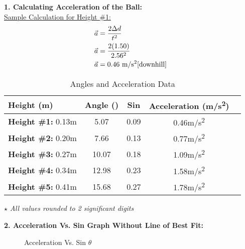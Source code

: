 \documentclass[12pt,letterpaper]{article}
\begin{document}
\textbf{1. Calculating Acceleration of the Ball:} \\
\underline{Sample Calculation for Height \#1:}\\
\[
	\begin{aligned}
		\vec{a} & =\frac{2\Delta d}{t^2}                        \\
		\vec{a} & =\frac{2(1.50)}{2.56^2}                       \\
		\vec{a} & =0.46~\text{m/s\textsuperscript{2}[downhill]}
	\end{aligned}
\]
\begin{table}[H]
	\caption{Angles and Acceleration Data\label{table2}}
	\begin{tabular*}{\textwidth}{l@{\extracolsep{\fill}}cccc}
		\hline
		\textbf{\hspace{4mm} Height (m)} & \textbf{Angle (\textdegree)} & \textbf{Sin \bm{$\theta$}} & \textbf{Acceleration (m/s\textsuperscript{2})} \\
		\hline
		\textbf{Height \#1:} 0.13m& 5.07\textdegree& 0.09& 0.46m/s\textsuperscript{2}\\
		\textbf{Height \#2:} 0.20m& 7.66\textdegree& 0.13& 0.77m/s\textsuperscript{2}\\
		\textbf{Height \#3:} 0.27m& 10.07\textdegree& 0.18& 1.09m/s\textsuperscript{2}\\
		\textbf{Height \#4:} 0.34m& 12.98\textdegree& 0.23& 1.58m/s\textsuperscript{2}\\
		\textbf{Height \#5:} 0.41m& 15.68\textdegree& 0.27& 1.78m/s\textsuperscript{2}\\
		\hline
	\end{tabular*}
\end{table}
\vspace{-8mm}
\textit{$\star$ All values rounded to 2 significant digits}
\newpage

\noindent
\textbf{2. Acceleration Vs. Sin \bm{$\theta$} Graph Without Line of Best Fit:}

\begin{figure}[H]
	\caption{Acceleration Vs. Sin $\theta$\label{figure1}}
	\vspace{-4mm}
\end{figure}
\end{document}
